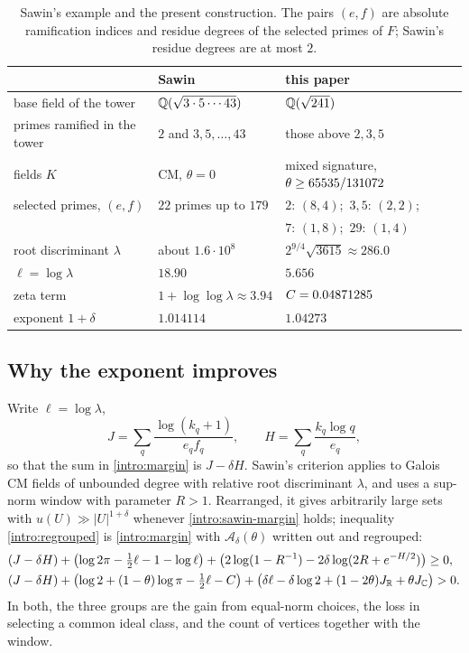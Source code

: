 \begin{table}[htbp]
\centering
\caption{Sawin's example and the present construction. The pairs $(e,f)$
are absolute ramification indices and residue degrees of the selected
primes of $F$; Sawin's residue degrees are at most $2$.}
\label{intro:table-constructions}
\begin{tabular}{lll}
\toprule
 & Sawin \cite{Sawin2026} & this paper\\
\midrule
base field of the tower & $\mathbb Q(\sqrt{3\cdot5\cdots43})$ & $\mathbb Q(\sqrt{241})$\\
primes ramified in the tower & $2$ and $3,5,\dots,43$ & those above $2,3,5$\\
fields $K$ & CM, $\theta=0$ & mixed signature, $\theta\ge65535/131072$\\
selected primes, $(e,f)$ & $22$ primes up to $179$ & $2{:}\,(8,4)$;\ $3,5{:}\,(2,2)$;\\
 & & $7{:}\,(1,8)$;\ $29{:}\,(1,4)$\\
root discriminant $\lambda$ & about $1.6\cdot10^8$ & $2^{9/4}\sqrt{3615}\approx286.0$\\
$\ell=\log\lambda$ & $18.90$ & $5.656$\\
zeta term & $1+\log\log\lambda\approx3.94$ & $C=0.04871285$\\
exponent $1+\delta$ & $1.014114$ & $1.04273$\\
\bottomrule
\end{tabular}
\end{table}

\subsection{Why the exponent improves}\label{intro:why}
Write $\ell=\log\lambda$,
\[
 J=\sum_q\frac{\log(k_q+1)}{e_qf_q},\qquad
 H=\sum_q\frac{k_q\log q}{e_q},
\]
so that the sum in \eqref{intro:margin} is $J-\delta H$. Sawin's
criterion \cite[Proposition~10]{Sawin2026} applies to Galois CM fields of
unbounded degree with relative root discriminant $\lambda$, and uses a
sup-norm window with parameter $R>1$. Rearranged, it gives arbitrarily
large sets with $u(U)\gg|U|^{1+\delta}$ whenever
\eqref{intro:sawin-margin} holds; inequality \eqref{intro:regrouped} is
\eqref{intro:margin} with $\mathcal A_\delta(\theta)$ written out and
regrouped:
\begin{align}
 &(J-\delta H)+\bigl(\log2\pi-\tfrac12\ell-1-\log\ell\bigr)
 +\bigl(2\log(1-R^{-1})-2\delta\log(2R+e^{-H/2})\bigr)\ge0,
 \label{intro:sawin-margin}\\
 &(J-\delta H)+\bigl(\log2+(1-\theta)\log\pi-\tfrac12\ell-C\bigr)
 +\bigl(\delta\ell-\delta\log2+(1-2\theta)J_\mathbb R+\theta J_\mathbb C\bigr)>0.
 \label{intro:regrouped}
\end{align}
In both, the three groups are the gain from equal-norm choices, the loss
in selecting a common ideal class, and the count of vertices together
with the window.

